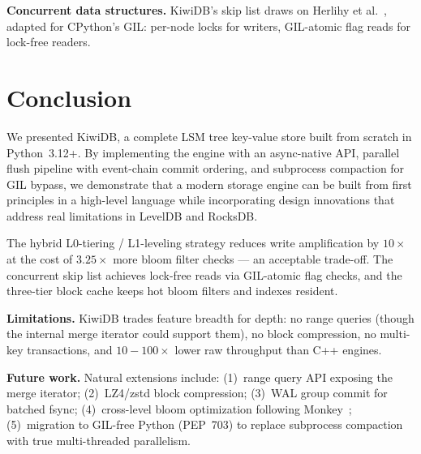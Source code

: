 \documentclass[conference]{IEEEtran}
\begin{document}
\textbf{Concurrent data structures.} KiwiDB's skip list draws on Herlihy et al.~\cite{herlihy2006}, adapted for CPython's GIL: per-node locks for writers, GIL-atomic flag reads for lock-free readers.

\section{Conclusion}
\label{sec:conclusion}

We presented KiwiDB, a complete LSM tree key-value store built from scratch in Python~3.12+. By implementing the engine with an async-native API, parallel flush pipeline with event-chain commit ordering, and subprocess compaction for GIL bypass, we demonstrate that a modern storage engine can be built from first principles in a high-level language while incorporating design innovations that address real limitations in LevelDB and RocksDB.

The hybrid L0-tiering / L1-leveling strategy reduces write amplification by $10\times$ at the cost of $3.25\times$ more bloom filter checks --- an acceptable trade-off. The concurrent skip list achieves lock-free reads via GIL-atomic flag checks, and the three-tier block cache keeps hot bloom filters and indexes resident.

\textbf{Limitations.} KiwiDB trades feature breadth for depth: no range queries (though the internal merge iterator could support them), no block compression, no multi-key transactions, and $10{-}100\times$ lower raw throughput than C++ engines.

\textbf{Future work.} Natural extensions include: (1)~range query API exposing the merge iterator; (2)~LZ4/zstd block compression; (3)~WAL group commit for batched fsync; (4)~cross-level bloom optimization following Monkey~\cite{dayan2017}; (5)~migration to GIL-free Python (PEP~703) to replace subprocess compaction with true multi-threaded parallelism.

\end{document}
